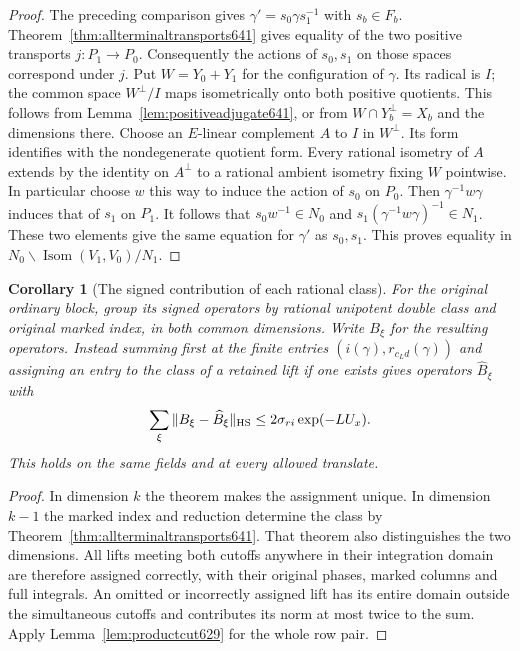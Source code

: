 \documentclass[a4paper,11pt]{article}
\newtheorem{corollary}[proposition]{Corollary}
\theoremstyle{definition}
\theoremstyle{remark}
\numberwithin{equation}{section}
\begin{document}
\begin{proof}
The preceding comparison gives
\(\gamma'=s_0\gamma s_1^{-1}\) with \(s_b\in F_b\).
Theorem~\ref{thm:allterminaltransports641} gives equality of
the two positive transports \(j:P_1\to P_0\). Consequently
the actions of \(s_0,s_1\) on those spaces correspond under
\(j\). Put \(W=Y_0+Y_1\) for the configuration of \(\gamma\).
Its radical is \(I\); the common space \(W^\perp/I\) maps
isometrically onto both positive quotients. This follows
from Lemma~\ref{lem:positiveadjugate641}, or from
\(W\cap Y_b^\perp=X_b\) and the dimensions there.
Choose an \(E\)-linear complement \(A\) to \(I\) in
\(W^\perp\). Its form identifies with the nondegenerate
quotient form. Every rational isometry of \(A\) extends by
the identity on \(A^\perp\) to a rational ambient isometry
fixing \(W\) pointwise. In particular choose \(w\) this way
to induce the action of \(s_0\) on \(P_0\). Then
\(\gamma^{-1}w\gamma\) induces that of \(s_1\) on \(P_1\).
It follows that \(s_0w^{-1}\in N_0\) and
\(s_1(\gamma^{-1}w\gamma)^{-1}\in N_1\). These two elements
give the same equation for \(\gamma'\) as \(s_0,s_1\).
This proves equality in \(N_0\backslash
\operatorname{Isom}(V_1,V_0)/N_1\).
\end{proof}

\begin{corollary}[The signed contribution of each rational class]
\leavevmode\label{cor:allrational645}
For the original ordinary block, group its signed operators
by rational unipotent double class and original marked index,
in both common dimensions. Write \(B_\xi\) for the resulting
operators. Instead summing first at the finite entries
\((i(\gamma),r_{c_Ld}(\gamma))\) and assigning an entry to
the class of a retained lift if one exists gives operators
\(\widehat B_\xi\) with
\[
           \sum_\xi\|B_\xi-\widehat B_\xi\|_{\rm HS}
                       \le 2\sigma_{ri}\exp(-LU_x).
\]
This holds on the same fields and at every allowed translate.
\end{corollary}
\begin{proof}
In dimension \(k\) the theorem makes the assignment unique.
In dimension \(k-1\) the marked index and reduction determine
the class by Theorem~\ref{thm:allterminaltransports641}.
That theorem also distinguishes the two dimensions. All lifts
meeting both cutoffs anywhere in their integration domain
are therefore assigned correctly, with their original phases,
marked columns and full integrals. An omitted or incorrectly
assigned lift has its entire domain outside the simultaneous
cutoffs and contributes its norm at most twice to the sum.
Apply Lemma~\ref{lem:productcut629} for the whole row pair.
\end{proof}
\end{document}
